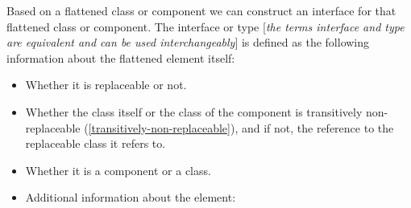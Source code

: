 Based on a flattened class or component we can construct an interface
for that flattened class or component. The interface or type
{[}\emph{the terms interface and type are equivalent and can be used
interchangeably}{]} is defined as the following information about the
flattened element itself:

\begin{itemize}
\item
  Whether it is replaceable or not.
\item
  Whether the class itself or the class of the component is transitively
  non-replaceable (\autoref{transitively-non-replaceable}), and if not, the reference to the
  replaceable class it refers to.
\item
  Whether it is a component or a class.
\item
  Additional information about the element:


\end{itemize}

